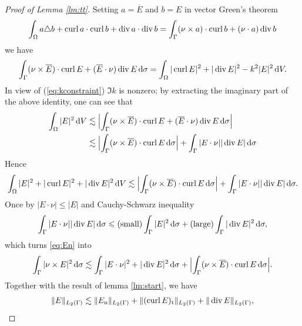 \begin{proof}[Proof of Lemma \ref{lm:tt}]
  Setting $a=\overline{E}$ and $b=E$ in vector Green's theorem 
  \begin{align*}
    \int_{\Omega}a\triangle b+\operatorname{curl} a\cdot\operatorname{curl} b+\operatorname{div} a\cdot\operatorname{div} b=\int_{\Gamma}(\nu\times a)\cdot\operatorname{curl} b+(\nu\cdot a)\operatorname{div} b
  \end{align*}
  we have
  \begin{align*}
    \int_{\Gamma}(\nu\times\overline{E})\cdot\operatorname{curl}{E}+(\overline{E}\cdot\nu)\operatorname{div} E\,\text{d}\sigma
    =\int_{\Omega}|\operatorname{curl} E|^2+|\operatorname{div} E|^2-k^2|E|^2\,\text{d}V.
  \end{align*}
  In view of (\ref{eq:kconstraint}) $\Im k$ is nonzero; by extracting the imaginary part of the above identity, one can see that
  \begin{align*} 
    \int_{\Omega}|E|^2\,\text{d}V&\lesssim\Bigl|\int_{\Gamma}(\nu\times\overline{E})\cdot\operatorname{curl}{E}+(\overline{E}\cdot\nu)\operatorname{div} E\,\text{d}\sigma\Bigr|\\ &\lesssim\Bigl|\int_{\Gamma}(\nu\times
    \overline{E})\cdot\operatorname{curl} E\,\text{d}\sigma\Bigr|+\int_{\Gamma}|E\cdot\nu||\operatorname{div} E|\,\text{d}\sigma
  \end{align*}
  Hence
  \begin{align*}
    \int_{\Omega}|E|^2+|\operatorname{curl} E|^2+|\operatorname{div} E|^2\,\text{d}V\lesssim\Bigl|\int_{\Gamma}(\nu\times\overline{E})\cdot\operatorname{curl} E\,\text{d}\sigma\Bigr|+\int_{\Gamma}|E\cdot\nu||\operatorname{div} E|\,\text{d}\sigma.
  \end{align*}
  Once by $|E\cdot\nu|\leqslant |E|$ and Cauchy-Schwarz inequality
  \begin{align*}
    \int_{\Gamma}|E\cdot\nu||\operatorname{div} E|\,\text{d}\sigma\leqslant\text{(small)}\int_{\Gamma}|E|^2\,\text{d}\sigma+
    \text{(large)}\int_{\Gamma}|\operatorname{div} E|^2\,\text{d}\sigma,
  \end{align*}
  which turns \eqref{eq:En} into
  \begin{align}
    \int_{\Gamma}|\nu\times E|^2\,\text{d}\sigma\lesssim\int_{\Gamma}|E\cdot\nu|^2+|\operatorname{div} E|^2\,\text{d}\sigma+\Bigl|
    \int_{\Gamma}(\nu\times\overline{E})\cdot\operatorname{curl}{E}\,\text{d}\sigma\Bigr|.
    \label{eq:ee} 
  \end{align}
  Together with the result of lemma \ref{lm:start}, we have
  \begin{equation}
    \begin{split}\label{eq:nl1}
      \nltwo{E} &\lesssim \nltwo{E_{\text{n}}}+\nltwo{(\curl E)_{\text{t}}}+\nltwo{\divv E},\\

\end{split}
\end{equation}
\end{proof}
